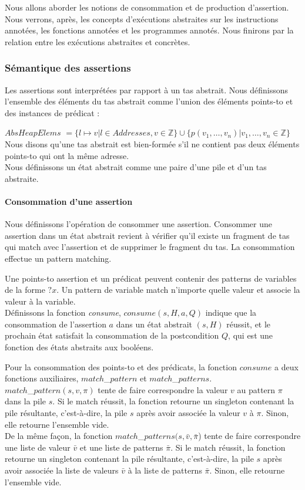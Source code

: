 \documentclass[11pt,openany]{article}
\begin{document}
	Nous allons aborder les notions de consommation et de production d'assertion. Nous verrons, apr\`es, les concepts d'ex\'ecutions abstraites sur les instructions annot\'ees, les fonctions annot\'ees et les programmes annot\'es. Nous finirons par la relation entre les ex\'ecutions abstraites et concr\`etes.\\
		\subsubsection{S\'emantique des assertions}
	Les assertions sont interpr\'et\'ees par rapport \`a un tas abstrait. Nous d\'efinissons l'ensemble des \'el\'ements du tas abstrait comme l'union des \'el\'ements points-to et des instances de pr\'edicat :
	
	$AbsHeapElems$ $= \{l\mapsto v| l\in Addresses, v\in \mathbb{Z}\}\cup\{p(v_1,\ldots, v_n)|v_1,\ldots,v_n\in\mathbb{Z}\}$\\
	Nous disons qu'une tas abstrait est bien-form\'ee s'il ne contient pas deux \'el\'ements points-to qui ont la m\^eme adresse.\\
	Nous d\'efinissons un \'etat abstrait comme une paire d'une pile et d'un tas abstraite.
	
			\paragraph{Consommation d'une assertion}
			Nous d\'efinissons l'op\'eration de consommer une assertion. Consommer une assertion dans un \'etat abstrait revient \`a v\'erifier qu'il existe un fragment de tas qui match avec l'assertion et de supprimer le fragment du tas. La consommation effectue un pattern matching.
	
	Une points-to assertion et un pr\'edicat peuvent contenir des patterns de variables de la forme $?x$. Un pattern de variable match n'importe quelle valeur et associe la valeur \`a la variable.\\
	D\'efinissons la fonction \textit{consume}, $consume(s,H,a,Q)$ indique que la consommation de l'assertion $a$ dans un \'etat abstrait $(s,H)$ r\'eussit, et le prochain \'etat satisfait la consommation de la postcondition $Q$, qui est une fonction des \'etats abstraits aux bool\'eens.
	
	Pour la consommation des points-to et des pr\'edicats, la fonction $consume$ a deux fonctions auxiliaires, $match$_$pattern$ et $match$_$patterns$.\\ $match$_$pattern(s,v,\pi)$ tente de faire correspondre la valeur $v$ au pattern $\pi$ dans la pile $s$. Si le match r\'eussit, la fonction retourne un singleton contenant la pile r\'esultante, c'est-\`a-dire, la pile $s$ apr\`es avoir associ\'ee la valeur $v$ \`a $\pi$. Sinon, elle retourne l'ensemble vide.\\
	De la m\^eme fa\c{c}on, la fonction $match$_$patterns(s,\bar{v},\bar{\pi}$) tente de faire correspondre une liste de valeur $\bar{v}$ et une liste de patterns $\bar{\pi}$. Si le match r\'eussit, la fonction retourne un singleton contenant la pile r\'esultante, c'est-\`a-dire, la pile $s$ apr\`es avoir associ\'ee la liste de valeurs $\bar{v}$ \`a la liste de patterns $\bar{\pi}$. Sinon, elle retourne l'ensemble vide.
	
\end{document}
